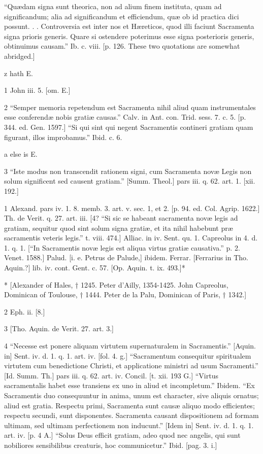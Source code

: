“Quædam signa sunt theorica, non ad alium finem instituta, quam ad significandum; alia ad significandum et efficiendum, quæ ob id practica dici possunt. . . Controversia est inter nos et Hæreticos, quod illi faciunt Sacramenta signa prioris generis. Quare si ostendere poterimus esse signa posterioris generis, obtinuimus causam.” Ib. c. viii. [p. 126. These two quotations are somewhat abridged.]

z
hath E.

1
John iii. 5. [om. E.]

2
“Semper memoria repetendum est Sacramenta nihil aliud quam instrumentales esse conferendæ nobis gratiæ causas.” Calv. in Ant. con. Trid. sess. 7. c. 5. [p. 344. ed. Gen. 1597.] “Si qui sint qui negent Sacramentis contineri gratiam quam figurant, illos improbamus.” Ibid. c. 6.

a
else is E.

3
“Iste modus non transcendit rationem signi, cum Sacramenta novæ Legis non solum significent sed causent gratiam.” [Summ. Theol.] pars iii. q. 62. art. 1. [xii. 192.]

1
Alexand. pars iv. 1. 8. memb. 3. art. v. sec. 1, et 2. [p. 94. ed. Col. Agrip. 1622.] Th. de Verit. q. 27. art. iii. [4? “Si sic se habeant sacramenta novæ legis ad gratiam, sequitur quod sint solum signa gratiæ, et ita nihil habebunt præ sacramentis veteris legis.” t. viii. 474.] Alliac. in iv. Sent. qu. 1. Capreolus in 4. d. 1. q. 1. [“In Sacramentis novæ legis est aliqua virtus gratiæ causativa.” p. 2. Venet. 1588.] Palud. [i. e. Petrus de Palude,] ibidem. Ferrar. [Ferrarius in Tho. Aquin.?] lib. iv. cont. Gent. c. 57. [Op. Aquin. t. ix. 493.]*

*
[Alexander of Hales, † 1245. Peter d’Ailly, 1354-1425. John Capreolus, Dominican of Toulouse, † 1444. Peter de la Palu, Dominican of Paris, † 1342.]

2
Eph. ii. [8.]

3
[Tho. Aquin. de Verit. 27. art. 3.]

4
“Necesse est ponere aliquam virtutem supernaturalem in Sacramentis.” [Aquin. in] Sent. iv. d. 1. q. 1. art. iv. [fol. 4. g.] “Sacramentum consequitur spiritualem virtutem cum benedictione Christi, et applicatione ministri ad usum Sacramenti.” [Id. Summ. Th.] pars iii. q. 62. art. iv. Concil. [t. xii. 193 G.] “Virtus sacramentalis habet esse transiens ex uno in aliud et incompletum.” Ibidem. “Ex Sacramentis duo consequuntur in anima, unum est character, sive aliquis ornatus; aliud est gratia. Respectu primi, Sacramenta sunt causæ aliquo modo efficientes; respectu secundi, sunt disponentes. Sacramenta causant dispositionem ad formam ultimam, sed ultimam perfectionem non inducunt.” [Idem in] Sent. iv. d. 1. q. 1. art. iv. [p. 4 A.] “Solus Deus efficit gratiam, adeo quod nec angelis, qui sunt nobiliores sensibilibus creaturis, hoc communicetur.” Ibid. [pag. 3. i.]

